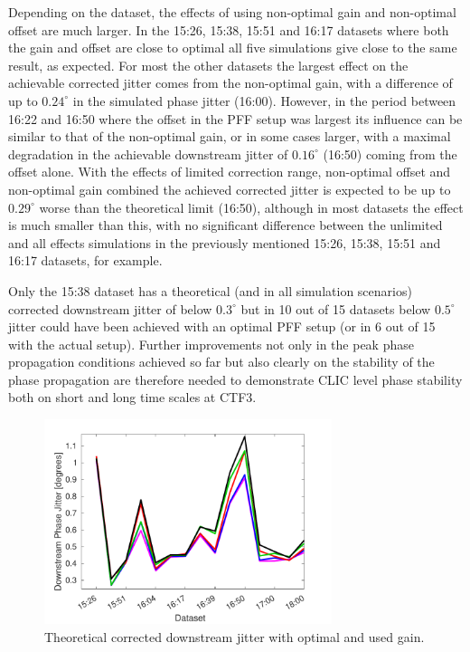 Depending on the dataset, the effects of using non-optimal gain and non-optimal offset are much larger. In the 15:26, 15:38, 15:51 and 16:17 datasets where both the gain and offset are close to optimal all five simulations give close to the same result, as expected. For most the other datasets the largest effect on the achievable corrected jitter comes from the non-optimal gain, with a difference of up to \(0.24^\circ\) in the simulated phase jitter (16:00). However, in the period between 16:22 and 16:50 where the offset in the PFF setup was largest its influence can be similar to that of the non-optimal gain, or in some cases larger, with a maximal degradation in the achievable downstream jitter of \(0.16^\circ\) (16:50) coming from the offset alone. With the effects of limited correction range, non-optimal offset and non-optimal gain combined the achieved corrected jitter is expected to be up to \(0.29^\circ\) worse than the theoretical limit (16:50), although in most datasets the effect is much smaller than this, with no significant difference between the unlimited and all effects simulations in the previously mentioned 15:26, 15:38, 15:51 and 16:17 datasets, for example. 

Only the 15:38 dataset has a theoretical (and in all simulation scenarios) corrected downstream jitter of below \(0.3^\circ\) but in 10 out of 15 datasets below \(0.5^\circ\) jitter could have been achieved with an optimal PFF setup (or in 6 out of 15 with the actual setup). Further improvements not only in the peak phase propagation conditions achieved so far but also clearly on the stability of the phase propagation are therefore needed to demonstrate CLIC level phase stability both on short and long time scales at CTF3.

\begin{figure}
  \centering
  \includegraphics[width=0.75\textwidth]{Figures/feedforward/longFF_datSetJitSim}
  \caption{Theoretical corrected downstream jitter with optimal and used gain.}
  \label{f:longFF_datSetJitSim}
\end{figure}

